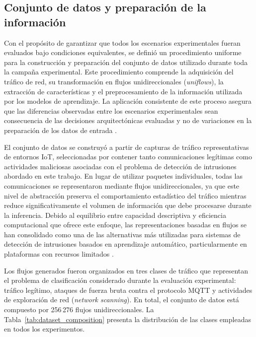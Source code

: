 \documentclass[journal,article,submit,moreauthors]{Definitions/mdpi}
\begin{document}
\subsection{Conjunto de datos y preparación de la información}
Con el propósito de garantizar que todos los escenarios experimentales fueran evaluados bajo condiciones equivalentes, se definió un procedimiento uniforme para la construcción y preparación del conjunto de datos utilizado durante toda la campaña experimental. Este procedimiento comprende la adquisición del tráfico de red, su transformación en flujos unidireccionales (\textit{uniflows}), la extracción de características y el preprocesamiento de la información utilizada por los modelos de aprendizaje. La aplicación consistente de este proceso asegura que las diferencias observadas entre los escenarios experimentales sean consecuencia de las decisiones arquitectónicas evaluadas y no de variaciones en la preparación de los datos de entrada \cite{Hajj2023,Ficco2024}.

El conjunto de datos se construyó a partir de capturas de tráfico representativas de entornos IoT, seleccionadas por contener tanto comunicaciones legítimas como actividades maliciosas asociadas con el problema de detección de intrusiones abordado en este trabajo. En lugar de utilizar paquetes individuales, todas las comunicaciones se representaron mediante flujos unidireccionales, ya que este nivel de abstracción preserva el comportamiento estadístico del tráfico mientras reduce significativamente el volumen de información que debe procesarse durante la inferencia. Debido al equilibrio entre capacidad descriptiva y eficiencia computacional que ofrece este enfoque, las representaciones basadas en flujos se han consolidado como una de las alternativas más utilizadas para sistemas de detección de intrusiones basados en aprendizaje automático, particularmente en plataformas con recursos limitados \cite{Moustafa2019,CICIoT2023}.

Los flujos generados fueron organizados en tres clases de tráfico que representan el problema de clasificación considerado durante la evaluación experimental: tráfico legítimo, ataques de fuerza bruta contra el protocolo MQTT y actividades de exploración de red (\textit{network scanning}). En total, el conjunto de datos está compuesto por 256\,276 flujos unidireccionales. La Tabla~\ref{tab:dataset_composition} presenta la distribución de las clases empleadas en todos los experimentos.
\end{document}
